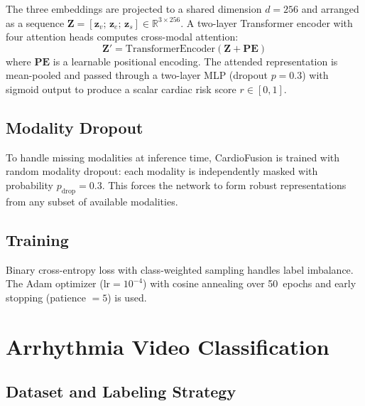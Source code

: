 \documentclass[journal,10pt,twoside]{IEEEtran}
\newcommand{\RR}{\mathbb{R}}
\newcommand{\myvec}[1]{\mathbf{#1}}
\begin{document}
The three embeddings are projected to a shared dimension $d{=}256$ and arranged as
a sequence $\myvec{Z} = [\myvec{z}_v;\, \myvec{z}_e;\, \myvec{z}_s] \in \RR^{3
\times 256}$.
A two-layer Transformer encoder with four attention heads computes cross-modal
attention:
\begin{equation}
  \myvec{Z}' = \mathrm{TransformerEncoder}\!\left(\myvec{Z} + \myvec{PE}\right)
  \label{eq:transformer}
\end{equation}
where $\myvec{PE}$ is a learnable positional encoding.
The attended representation is mean-pooled and passed through a two-layer MLP
(dropout $p{=}0.3$) with sigmoid output to produce a scalar cardiac risk
score $r \in [0,1]$.

\subsection{Modality Dropout}

To handle missing modalities at inference time, CardioFusion is trained with random
modality dropout: each modality is independently masked with probability
$p_\text{drop}{=}0.3$.
This forces the network to form robust representations from any subset of available
modalities.

\subsection{Training}

Binary cross-entropy loss with class-weighted sampling handles label imbalance.
The Adam optimizer ($\mathrm{lr}{=}10^{-4}$) with cosine annealing over 50~epochs and
early stopping (patience $= 5$) is used.

\section{Arrhythmia Video Classification}
\label{sec:arrhythmia}

\subsection{Dataset and Labeling Strategy}
\end{document}

